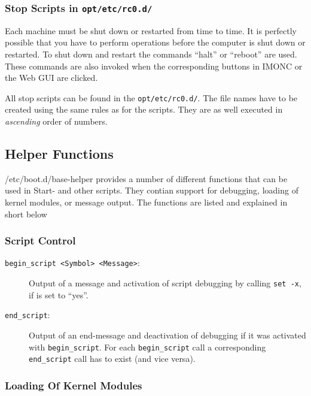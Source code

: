 \subsubsection{Stop Scripts in \texttt{opt/etc/rc0.d/}}

Each machine must be shut down or restarted from time to time. It is
perfectly possible that you have to perform operations before the computer
is shut down or restarted. To shut down and restart the commands ``halt''
or ``reboot'' are used. These commands are also invoked when the corresponding
buttons in IMONC or the Web GUI are clicked.

All stop scripts can be found in the \texttt{opt/etc/rc0.d/}. The file names
have to be created using the same rules as for the scripts. They are as well
executed in \emph{ascending} order of numbers.

\subsection{Helper Functions}

{/etc/boot.d/base-helper} provides a number of different functions that can
be used in Start- and other scripts. They contian support for debugging, loading
of kernel modules, or message output. The functions
are listed and explained in short below

\subsubsection{Script Control}

\begin{description}

\item[\texttt{begin\_script <Symbol> <Message>}:]
Output of a message and activation of script debugging by calling
\texttt{set -x}, if  is set to ``yes''.

\item[\texttt{end\_script}:]
Output of an end-message and deactivation of debugging if it was activated
with \texttt{begin\_script}. For each \texttt{begin\_script} call a corresponding
\texttt{end\_script} call has to exist (and vice versa).

\end{description}

\subsubsection{Loading Of Kernel Modules}

